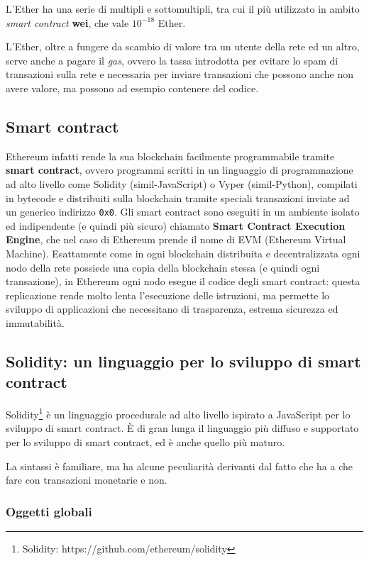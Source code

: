 L'Ether ha una serie di multipli e sottomultipli, tra cui il più utilizzato in ambito \emph{smart contract} \textbf{wei},
che vale $10^{-18}$ Ether.

L'Ether, oltre a fungere da scambio di valore tra un utente della rete ed un altro, serve anche a pagare il \emph{gas}, ovvero la tassa
introdotta per evitare lo spam di transazioni sulla rete e necessaria per inviare transazioni che possono anche non avere valore,
ma possono ad esempio contenere del codice.

\subsection{Smart contract}

Ethereum infatti rende la sua blockchain facilmente programmabile tramite \textbf{smart contract}, ovvero programmi scritti
in un linguaggio di programmazione ad alto livello come Solidity (simil-JavaScript) o Vyper (simil-Python),
compilati in bytecode e distribuiti sulla blockchain tramite speciali transazioni inviate ad un generico indirizzo \texttt{0x0}. 
Gli smart contract sono eseguiti in un ambiente isolato ed indipendente (e quindi più sicuro)
chiamato \textbf{Smart Contract Execution Engine}, che nel caso di Ethereum prende il nome di EVM (Ethereum Virtual Machine).
Esattamente come in ogni blockchain distribuita e decentralizzata ogni nodo della rete possiede una copia della blockchain stessa
(e quindi ogni transazione), in Ethereum ogni nodo esegue il codice degli smart contract: questa replicazione rende molto lenta
l’esecuzione delle istruzioni, ma permette lo sviluppo di applicazioni che necessitano di trasparenza, estrema sicurezza ed immutabilità.

\subsection{Solidity: un linguaggio per lo sviluppo di smart contract}

Solidity\footnote{Solidity: https://github.com/ethereum/solidity} è un linguaggio procedurale ad alto livello ispirato a JavaScript
per lo sviluppo di smart contract.
\`E di gran lunga il linguaggio più diffuso e supportato per lo sviluppo di smart contract, ed
è anche quello più maturo.

La sintassi è familiare, ma ha alcune peculiarità derivanti dal fatto che ha a che fare con
transazioni monetarie e non.

\subsubsection{Oggetti globali}

